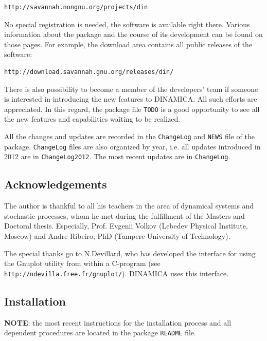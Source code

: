 \documentclass[11pt,a4paper]{article}
\begin{document}
\begin{verbatim}
http://savannah.nongnu.org/projects/din
\end{verbatim}
No special registration is needed, the software is available right there. Various
information about the package and the course of its development can be found on those
pages. For example, the download area contains all public releases of the software:

\begin{verbatim}
http://download.savannah.gnu.org/releases/din/
\end{verbatim}
There is also possibility to become a member of the developers' team if someone is
interested in introducing the new features to DINAMICA. All such efforts are
appreciated. In this regard, the package file \texttt{TODO} is a good opportunity to
see all the new features and capabilities waiting to be realized.

All the changes and updates are recorded in the \texttt{ChangeLog} and
\texttt{NEWS} file of the package. \texttt{ChangeLog} files are also organized by
year, i.e. all updates introduced in 2012 are in \texttt{ChangeLog2012}. The most
recent updates are in \texttt{ChangeLog}.

\subsection{Acknowledgements}
\label{sec:acknowledgements}

The author is thankful to all his teachers in the area of dynamical systems and
stochastic processes, whom he met during the fulfillment of the Masters and Doctoral
thesis. Especially, Prof. Evgenii Volkov (Lebedev Physical Institute, Moscow) and
Andre Ribeiro, PhD (Tampere University of Technology).

The special thanks go to N.Devillard, who has developed the interface for using the
Gnuplot utility from within a C-program \newline (see
\texttt{http://ndevilla.free.fr/gnuplot/}). DINAMICA uses this interface.


\subsection{Installation}
\label{sec:installation}

\textbf{NOTE}: the most recent instructions for the installation process and all
dependent procedures are located in the package \texttt{README} file.
\end{document}
